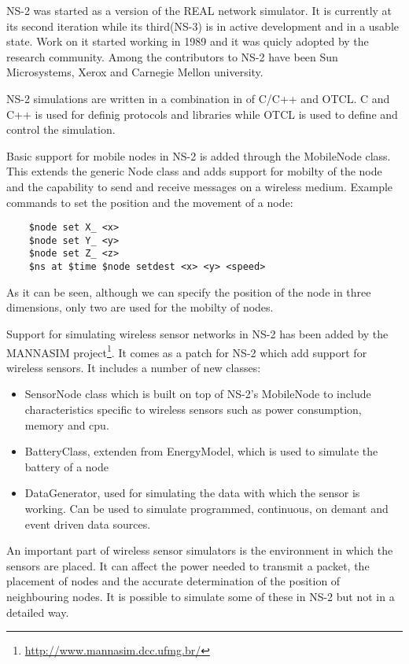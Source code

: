 \label{subsec:ns2}

NS-2 was started as a version of the REAL network simulator. It is currently at its 
second iteration while its third(NS-3) is in active development and in a usable state.
Work on it started working in 1989 and it was quicly adopted by the research community.
Among the contributors to NS-2 have been Sun Microsystems, Xerox and Carnegie Mellon 
university. 

NS-2 simulations are written in a combination in of C/C++ and OTCL. C and C++ is 
used for definig protocols and libraries while OTCL is used to define and control
the simulation.

Basic support for mobile nodes in NS-2 is added through the MobileNode class. This extends
the generic Node class and adds support for mobilty of the node and the capability to
send and receive messages on a wireless medium. 
Example commands to set the position and the movement of a node:
\lstset{numbers=none,language=C,caption=Commands to set the position and movement of a node,label=lst:saddrule}
\begin{lstlisting}
	$node set X_ <x>
	$node set Y_ <y>
	$node set Z_ <z>
	$ns at $time $node setdest <x> <y> <speed>
\end{lstlisting}
As it can be seen, although we can specify the position of the node in three dimensions,
only two are used for the mobilty of nodes.

Support for simulating wireless sensor networks in NS-2 has been added by the 
MANNASIM project\footnote{\url{http://www.mannasim.dcc.ufmg.br/}}. It comes as
a patch for NS-2 which add support for wireless sensors. It includes a number of
new classes:
\begin{itemize}
	\item SensorNode class which is built on top of NS-2's MobileNode 
to include characteristics specific to wireless sensors such as power 
consumption, memory and cpu.
	\item BatteryClass, extenden from EnergyModel, which is used to simulate
the battery of a node
	\item DataGenerator, used for simulating the data with which the sensor is
working. Can be used to simulate programmed, continuous, on demant and event driven
data sources.
\end{itemize}

An important part of wireless sensor simulators is the environment in which the sensors
are placed. It can affect the power needed to transmit a packet, the placement of nodes
and the accurate determination of the position of neighbouring nodes. It is possible to
simulate some of these in NS-2 but not in a detailed way.
